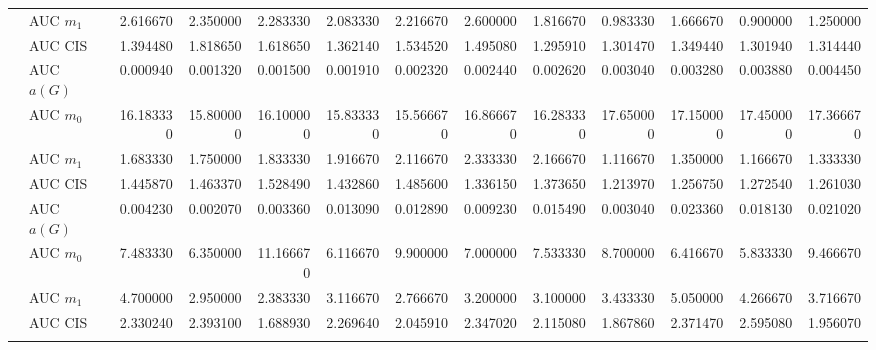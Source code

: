 \begin{table}[htbp]
\begin{tabular}{llrrrrrrrrrrr}
    & AUC $m_1$ & 2.616670 & 2.350000 & 2.283330 & 2.083330 & 2.216670 & 2.600000 & 1.816670 & 0.983330 & 1.666670 & 0.900000 & 1.250000 \\
    & AUC CIS & 1.394480 & 1.818650 & 1.618650 & 1.362140 & 1.534520 & 1.495080 & 1.295910 & 1.301470 & 1.349440 & 1.301940 & 1.314440 \\
    \addlinespace
    \multirow{4}{*}{degree} & AUC $a(G)$ & 0.000940 & 0.001320 & 0.001500 & 0.001910 & 0.002320 & 0.002440 & 0.002620 & 0.003040 & 0.003280 & 0.003880 & 0.004450 \\
    & AUC $m_0$ & 16.183330 & 15.800000 & 16.100000 & 15.833330 & 15.566670 & 16.866670 & 16.283330 & 17.650000 & 17.150000 & 17.450000 & 17.366670 \\
    & AUC $m_1$ & 1.683330 & 1.750000 & 1.833330 & 1.916670 & 2.116670 & 2.333330 & 2.166670 & 1.116670 & 1.350000 & 1.166670 & 1.333330 \\
    & AUC CIS & 1.445870 & 1.463370 & 1.528490 & 1.432860 & 1.485600 & 1.336150 & 1.373650 & 1.213970 & 1.256750 & 1.272540 & 1.261030 \\
    \addlinespace
    \multirow{4}{*}{random} & AUC $a(G)$ & 0.004230 & 0.002070 & 0.003360 & 0.013090 & 0.012890 & 0.009230 & 0.015490 & 0.003040 & 0.023360 & 0.018130 & 0.021020 \\
    & AUC $m_0$ & 7.483330 & 6.350000 & 11.166670 & 6.116670 & 9.900000 & 7.000000 & 7.533330 & 8.700000 & 6.416670 & 5.833330 & 9.466670 \\
    & AUC $m_1$ & 4.700000 & 2.950000 & 2.383330 & 3.116670 & 2.766670 & 3.200000 & 3.100000 & 3.433330 & 5.050000 & 4.266670 & 3.716670 \\
    & AUC CIS & 2.330240 & 2.393100 & 1.688930 & 2.269640 & 2.045910 & 2.347020 & 2.115080 & 1.867860 & 2.371470 & 2.595080 & 1.956070 \\
    \addlinespace
    \bottomrule
  \end{tabular}
\end{table}

